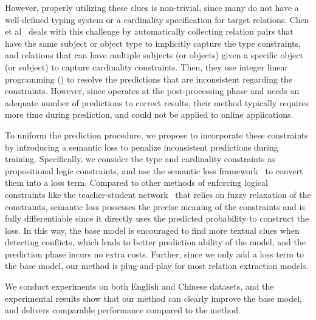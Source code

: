 However, properly utilizing these clues is non-trivial, since many \KBs do not have a well-defined typing system or a cardinality specification for target relations.
Chen et al~ deals with this challenge by automatically collecting relation pairs that have the same subject or object type to implicitly capture the type constraints, and relations that can have multiple subjects (or objects) given a specific object (or subject) to capture cardinality constraints.
Then, they use  integer linear programming (\ILP) to resolve the predictions that are inconsistent regarding the constraints.
However, since \ILP operates at the post-processing phase and needs an adequate number of predictions to correct results, their method typically requires more time during prediction, 
and could not be applied to online applications.

To uniform the prediction procedure,
we propose to incorporate these constraints by introducing a semantic loss to penalize inconsistent predictions during training.
Specifically, we consider the type and cardinality constraints as propositional logic constraints, and use the semantic loss framework~\cite{xu2017semantic} to convert them into a loss term.
Compared to other methods of enforcing logical constraints like the teacher-student network~\cite{hu2016harnessing} that relies on fuzzy relaxation of the constraints, semantic loss possesses the precise meaning of the constraints and is fully differentiable since it directly uses the predicted probability to construct the loss.
In this way, the base model is encouraged to find more textual clues when detecting conflicts, which leads to better prediction ability of the model, and the prediction phase incurs no extra costs.
Further, since we only add a loss term to the base model, our method is plug-and-play for most relation extraction models.

We conduct experiments on both English and Chinese datasets,
and the experimental results show that our method can clearly improve the base model, and delivers comparable performance compared to the \ILP method.

